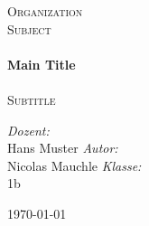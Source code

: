 \begin{titlepage}
\begin{center}
\textsc{\LARGE Organization}\\[1.5cm]
\textsc{\Large Subject}\\[0.5cm]
\HRule \\[0.4cm]
{ \huge \bfseries Main Title}\\[0.4cm]
\HRule \\[1cm]
\textsc{\large Subtitle}\\[1.5cm]
\begin{minipage}{1.2\textwidth}
\begin{flushleft} \large
\emph{Dozent:} \\
Hans Muster
\newline
\newline
\emph{Autor:}\\
Nicolas Mauchle
\newline
\newline
\emph{Klasse:} \\
1b
\end{flushleft}
\end{minipage}
\vfill
{\large \today}
\end{center}
\end{titlepage}